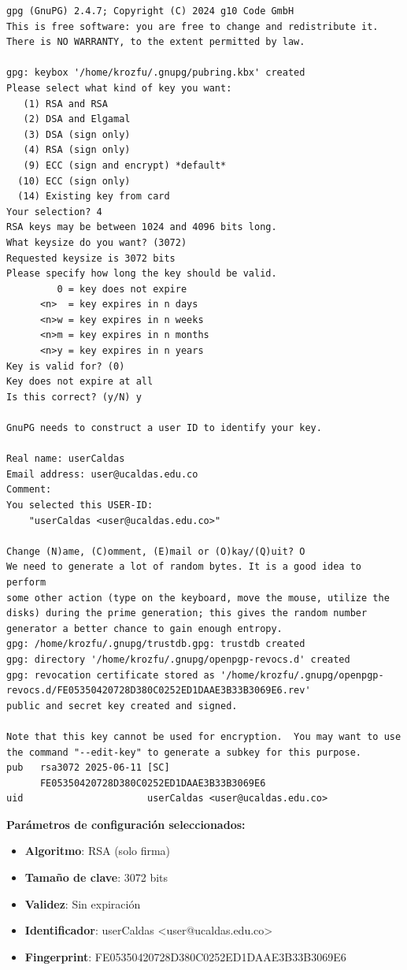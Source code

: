 \documentclass[12pt,a4paper]{article}
\begin{document}
\begin{lstlisting}[language=text, caption=Proceso interactivo de generación de clave PGP, breaklines=true]
gpg (GnuPG) 2.4.7; Copyright (C) 2024 g10 Code GmbH
This is free software: you are free to change and redistribute it.
There is NO WARRANTY, to the extent permitted by law.

gpg: keybox '/home/krozfu/.gnupg/pubring.kbx' created
Please select what kind of key you want:
   (1) RSA and RSA
   (2) DSA and Elgamal
   (3) DSA (sign only)
   (4) RSA (sign only)
   (9) ECC (sign and encrypt) *default*
  (10) ECC (sign only)
  (14) Existing key from card
Your selection? 4
RSA keys may be between 1024 and 4096 bits long.
What keysize do you want? (3072) 
Requested keysize is 3072 bits
Please specify how long the key should be valid.
         0 = key does not expire
      <n>  = key expires in n days
      <n>w = key expires in n weeks
      <n>m = key expires in n months
      <n>y = key expires in n years
Key is valid for? (0) 
Key does not expire at all
Is this correct? (y/N) y

GnuPG needs to construct a user ID to identify your key.

Real name: userCaldas
Email address: user@ucaldas.edu.co
Comment: 
You selected this USER-ID:
    "userCaldas <user@ucaldas.edu.co>"

Change (N)ame, (C)omment, (E)mail or (O)kay/(Q)uit? O
We need to generate a lot of random bytes. It is a good idea to perform
some other action (type on the keyboard, move the mouse, utilize the
disks) during the prime generation; this gives the random number
generator a better chance to gain enough entropy.
gpg: /home/krozfu/.gnupg/trustdb.gpg: trustdb created
gpg: directory '/home/krozfu/.gnupg/openpgp-revocs.d' created
gpg: revocation certificate stored as '/home/krozfu/.gnupg/openpgp-revocs.d/FE05350420728D380C0252ED1DAAE3B33B3069E6.rev'
public and secret key created and signed.

Note that this key cannot be used for encryption.  You may want to use
the command "--edit-key" to generate a subkey for this purpose.
pub   rsa3072 2025-06-11 [SC]
      FE05350420728D380C0252ED1DAAE3B33B3069E6
uid                      userCaldas <user@ucaldas.edu.co>
\end{lstlisting}

\textbf{Parámetros de configuración seleccionados:}

\begin{itemize}
  \item \textbf{Algoritmo}: RSA (solo firma)
  \item \textbf{Tamaño de clave}: 3072 bits
  \item \textbf{Validez}: Sin expiración
  \item \textbf{Identificador}: userCaldas <user@ucaldas.edu.co>
  \item \textbf{Fingerprint}: FE05350420728D380C0252ED1DAAE3B33B3069E6
\end{itemize}
\end{document}
